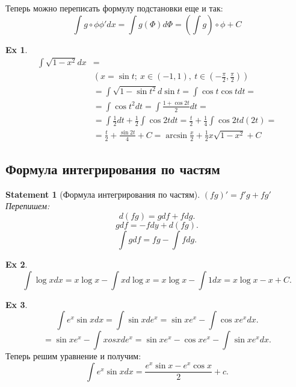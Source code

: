 \documentclass[11pt]{book}
\theoremstyle{definition}
\theoremstyle{plain}
\theoremstyle{plain}
\newtheorem*{st}{Statement}
\theoremstyle{definition}
\newtheorem*{ex}{Ex}
\theoremstyle{remark}
\begin{document}
Теперь можно переписать формулу подстановки еще и так:
$$\int{g \circ \phi \phi' dx} = \int{g(\Phi)d\Phi} = \left(\int{g}\right)\circ \phi + C$$

\begin{ex}
$$
\begin{aligned}
    \int{\sqrt{1 - x^2}dx} &= \\
			   &\left(x = \sin{t};~ x \in (-1, 1),~ t \in \left(-\frac{\pi}{2}, \frac{\pi}{2}\right)\right) \\
			   &= \int{\sqrt{1 - \sin{t}^2}d\sin{t}} = \int{\cos{t}\cos{t}dt} = \\ 
			   &= \int{\cos{t}^2dt} = \int{\frac{1 + \cos{2t}}{2}dt} = \\
			   &=\int{\frac{1}{2}dt} + \frac{1}{2}\int{\cos{2t}dt} = \frac{t}{2} + \frac{1}{4}\int{\cos{2t}d(2t)} = \\
			   &= \frac{t}{2} + \frac{\sin{2t}}{4} + C = \arcsin{\frac{x}{2}} + \frac{1}{2}x\sqrt{1 - x^2} + C
\end{aligned}
$$
\end{ex}

\subsection{Формула интегрирования по частям}
\begin{st}[Формула интегрирования по частям]

    $ (fg)' = f'g + fg'$
    Перепишем:
    \[
	d(fg) = g df + f dg
    .\]
    \[
	g df = -f dy + d(fg)
    .\]
    \[
	\int g df = fg - \int f dg
    .\]
\end{st}
\begin{ex}
    \[
	\int \log x dx = x \log x - \int x d \log x = x \log x - \int 1 dx = x \log x -x + C
    .\]
\end{ex}
\begin{ex}
    \[
	\int e^{x} \sin x dx = \int \sin x d e^{x} = \sin x e^{ x} - \int \cos x e^{x} dx
    .\]
    \[
	= \sin x e^{x} - \int xos x d e^{x} = \sin x e^{x} - \cos x e^{ x} - \int \sin x e ^{x} dx
    .\]
    Теперь решим уравнение и получим:
    \[
	\int e^{x} \sin x dx = \frac{e^{x} \sin x - e^{x} \cos x}{2} + c
    .\]
\end{ex}
\end{document}
